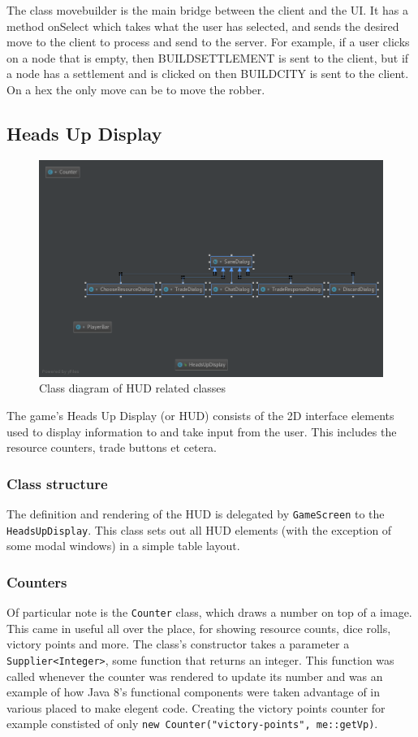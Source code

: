 \documentclass[a4paper,doc]{apa6}
\newcommand{\code}{\texttt}
\begin{document}
The class movebuilder is the main bridge between the client and the UI. It has a method onSelect which takes what the user has selected, and sends the desired move to the client to process and send to the server. For example, if a user clicks on a node that is empty, then BUILDSETTLEMENT is sent to the client, but if a node has a settlement and is clicked on then BUILDCITY is sent to the client. On a hex the only move can be to move the robber. 

\subsection{Heads Up Display}
\begin{figure}
      \includegraphics[width=\textwidth]{images/DialogsDiagram}
      \caption{Class diagram of HUD related classes}
\end{figure}

The game's Heads Up Display (or HUD) consists of the 2D interface elements used to display information to and take input from the user. This includes the resource counters, trade buttons et cetera.

\subsubsection{Class structure}
The definition and rendering of the HUD is delegated by \code{GameScreen} to the \code{HeadsUpDisplay}. This class sets out all HUD elements (with the exception of some modal windows) in a simple table layout.

\subsubsection{Counters}
Of particular note is the \code{Counter} class, which draws a number on top of a image. This came in useful all over the place, for showing resource counts, dice rolls, victory points and more. The class's constructor takes a parameter a \code{Supplier<Integer>}, some function that returns an integer. This function was called whenever the counter was rendered to update its number and was an example of how Java 8's functional components were taken advantage of in various placed to make elegent code. Creating the victory points counter for example constisted of only \code{new Counter("victory-points", me::getVp)}.
\end{document}
